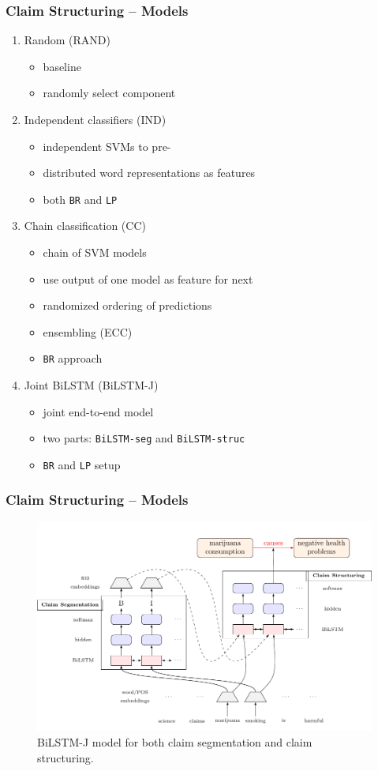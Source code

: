 \documentclass{beamer}
\begin{document}
\begin{frame}
	\frametitle{Claim Structuring -- Models}
	\begin{enumerate}

		\item Random (RAND)
			\begin{itemize}
				\item baseline
				\item randomly select component
			\end{itemize}
		\item Independent classifiers (IND)
			\begin{itemize}
				\item independent SVMs to pre-
				\item distributed word representations as features
				\item both \texttt{BR} and \texttt{LP}
			\end{itemize}
		\item Chain classification (CC)
			\begin{itemize}
				\item chain of SVM models
				\item use output of one model as feature for next
				\item randomized ordering of predictions
				\item ensembling (ECC)
				\item \texttt{BR} approach
			\end{itemize}
		\item Joint BiLSTM (BiLSTM-J)
			\begin{itemize}
				\item joint end-to-end model
				\item two parts: \texttt{BiLSTM-seg} and \texttt{BiLSTM-struc}
				\item \texttt{BR} and \texttt{LP} setup
			\end{itemize}
	\end{enumerate}

\end{frame}

\begin{frame}
	\frametitle{Claim Structuring -- Models}
\begin{figure}
	\includegraphics[scale=0.63]{../joint_tikz-figure0.pdf}
	\caption{BiLSTM-J model for both claim segmentation and claim 
	structuring. }
\end{figure}
\end{frame}
\end{document}

